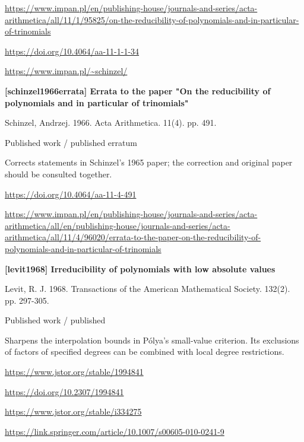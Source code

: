 \documentclass[11pt,a4paper,oneside,openany]{book}
\begin{document}
{\footnotesize\url{https://www.impan.pl/en/publishing-house/journals-and-series/acta-arithmetica/all/11/1/95825/on-the-reducibility-of-polynomials-and-in-particular-of-trinomials}}\par
{\footnotesize\url{https://doi.org/10.4064/aa-11-1-1-34}}\par
{\footnotesize\url{https://www.impan.pl/~schinzel/}}\par
\vspace{9pt}
\hypertarget{ref:schinzel1966errata}{}
{\sffamily\bfseries\color{atlasgreen}[schinzel1966errata] Errata to the paper "On the reducibility of polynomials and in particular of trinomials"}\par
\color{black} Schinzel, Andrzej. 1966. Acta Arithmetica. 11(4). pp. 491.\par
{\small\sffamily\color{atlasgold}Published work / published erratum}\par
\color{black} Corrects statements in Schinzel's 1965 paper; the correction and original paper should be consulted together.\par
{\footnotesize\url{https://doi.org/10.4064/aa-11-4-491}}\par
{\footnotesize\url{https://www.impan.pl/en/publishing-house/journals-and-series/acta-arithmetica/all/en/publishing-house/journals-and-series/acta-arithmetica/all/11/4/96020/errata-to-the-paper-on-the-reducibility-of-polynomials-and-in-particular-of-trinomials}}\par
\vspace{9pt}
\hypertarget{ref:levit1968}{}
{\sffamily\bfseries\color{atlasgreen}[levit1968] Irreducibility of polynomials with low absolute values}\par
\color{black} Levit, R. J. 1968. Transactions of the American Mathematical Society. 132(2). pp. 297-305.\par
{\small\sffamily\color{atlasgold}Published work / published}\par
\color{black} Sharpens the interpolation bounds in Pólya's small-value criterion. Its exclusions of factors of specified degrees can be combined with local degree restrictions.\par
{\footnotesize\url{https://www.jstor.org/stable/1994841}}\par
{\footnotesize\url{https://doi.org/10.2307/1994841}}\par
{\footnotesize\url{https://www.jstor.org/stable/i334275}}\par
{\footnotesize\url{https://link.springer.com/article/10.1007/s00605-010-0241-9}}\par
\end{document}
